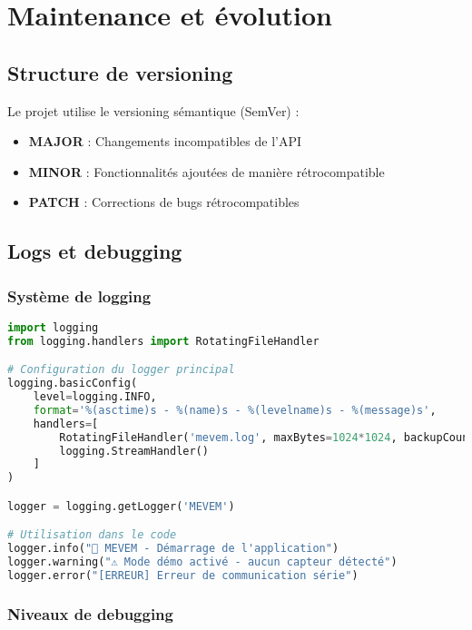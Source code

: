 \documentclass[12pt,a4paper]{article}
\begin{document}
\section{Maintenance et évolution}

\subsection{Structure de versioning}

Le projet utilise le versioning sémantique (SemVer) :
\begin{itemize}
    \item \textbf{MAJOR} : Changements incompatibles de l'API
    \item \textbf{MINOR} : Fonctionnalités ajoutées de manière rétrocompatible
    \item \textbf{PATCH} : Corrections de bugs rétrocompatibles
\end{itemize}

\subsection{Logs et debugging}

\subsubsection{Système de logging}

\begin{lstlisting}[language=python, caption=Configuration du logging]
import logging
from logging.handlers import RotatingFileHandler

# Configuration du logger principal
logging.basicConfig(
    level=logging.INFO,
    format='%(asctime)s - %(name)s - %(levelname)s - %(message)s',
    handlers=[
        RotatingFileHandler('mevem.log', maxBytes=1024*1024, backupCount=5),
        logging.StreamHandler()
    ]
)

logger = logging.getLogger('MEVEM')

# Utilisation dans le code
logger.info("🌽 MEVEM - Démarrage de l'application")
logger.warning("⚠️ Mode démo activé - aucun capteur détecté")
logger.error("[ERREUR] Erreur de communication série")
\end{lstlisting}

\subsubsection{Niveaux de debugging}
\end{document}
